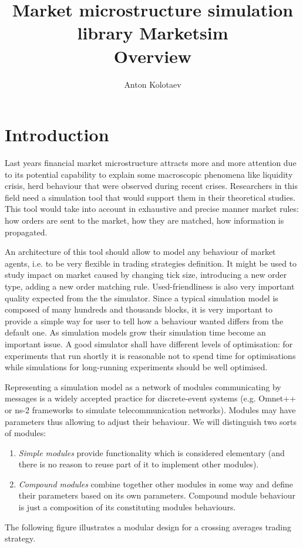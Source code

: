 \documentclass[a4paper,11pt]{article}
\title{Market microstructure simulation library Marketsim\\Overview}
\author{Anton Kolotaev}
\begin{document}
\maketitle

\tableofcontents



















\newpage

\section{Introduction}
Last years financial market microstructure attracts more and more
attention due to its potential capability to explain some macroscopic
phenomena like liquidity crisis, herd behaviour that were observed during
recent crises. Researchers in this field need a simulation tool that would
support them in their theoretical studies. This tool would take into
account in exhaustive and precise manner market rules: how orders are sent to the market,
how they are matched, how information is propagated.

An architecture of this tool should allow to model any behaviour of market
agents, i.e. to be very flexible in trading strategies definition. It might be
used to study impact on market caused by changing tick size, introducing
a new order type, adding a new order matching rule.
Used-friendliness is also very important quality expected from the the simulator. 
Since a typical simulation model is composed of
many hundreds and thousands blocks, it is very important to provide
a simple way for user to tell how a behaviour wanted differs from the
default one. 
As simulation models grow their simulation time become an important issue. A good simulator shall 
have different levels of optimisation: for experiments that run shortly it is reasonable not to spend time for optimisations while simulations for long-running experiments should be well optimised.

Representing a simulation model as a network of modules communicating
by messages is a widely accepted practice for discrete-event systems (e.g.
Omnet++ or ns-2 frameworks to simulate telecommunication networks).
Modules may have parameters thus allowing to adjust their behaviour.
We will distinguish two sorts of modules:
\begin{enumerate}
\item \emph{Simple modules} provide functionality which is considered elementary
(and there is no reason to reuse part of it to implement other
modules).
\item \emph{Compound modules} combine together other modules in some way
and define their parameters based on its own parameters. Compound
module behaviour is just a composition of its constituting modules
behaviours.
\end{enumerate}
The following figure illustrates a modular design for a crossing averages trading strategy.
\end{document}
